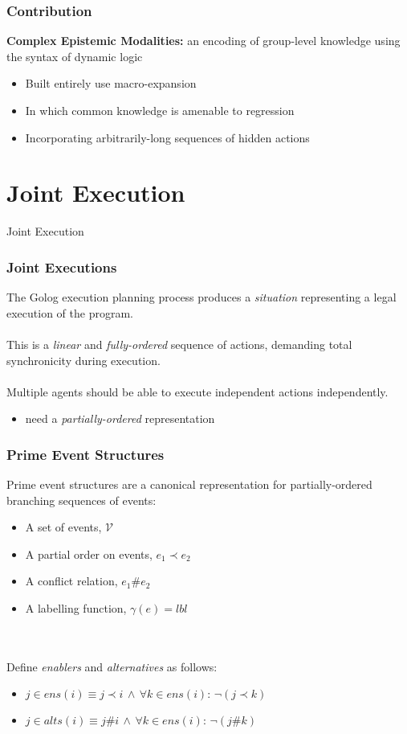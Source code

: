 \documentclass{beamer}
\begin{document}
\begin{frame}
\frametitle{Contribution}
\textbf{Complex Epistemic Modalities:}  an encoding of group-level knowledge using the syntax of dynamic logic
\begin{itemize}
\item Built entirely use macro-expansion
\item In which common knowledge is amenable to regression
\item Incorporating arbitrarily-long sequences of hidden actions
\end{itemize}
\end{frame}

\section{Joint Execution}

\begin{frame}
\centering \large Joint Execution\\
\end{frame}


\begin{frame}
\frametitle{Joint Executions}
The Golog execution planning process produces a \emph{situation} representing
a legal execution of the program.
\ \\
\ \\
This is a \emph{linear} and \emph{fully-ordered} sequence of actions, 
demanding total synchronicity during execution.
\ \\
\ \\
Multiple agents should be able to execute independent actions independently.
\begin{itemize}
\item need a \emph{partially-ordered} representation
\end{itemize}
\end{frame}

\begin{frame}
\frametitle{Prime Event Structures}
Prime event structures are a canonical representation for partially-ordered
branching sequences of events:
\begin{itemize}
\item A set of events, $\mathcal{V}$
\item A partial order on events, $e_1 \prec e_2$
\item A conflict relation, $e_1 \# e_2$
\item A labelling function, $\gamma(e) = lbl$
\end{itemize}
\ \\
\ \\
Define \emph{enablers} and \emph{alternatives} as follows:
\begin{itemize}
\item $j\in ens(i)\equiv j\prec i\,\wedge\,\forall k\in ens(i):\,\neg(j\prec k)$
\item $j\in alts(i)\equiv j \# i\,\wedge\,\forall k\in ens(i):\,\neg(j \# k)$
\end{itemize}
\end{frame}
\end{document}
